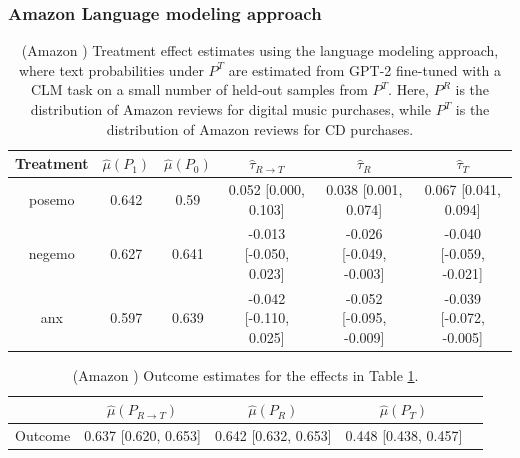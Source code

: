 \documentclass{article}
\begin{document}
\subsubsection{Amazon \cite{przyant2021causal} Language modeling approach}

\begin{table}[!ht]
    \centering
    \begin{tabular}{c|ccccc}
    \toprule
    Treatment   &   $\hat{\mu}(P_1)$ &   $\hat{\mu}(P_0)$ & $\hat{\tau}_{R \rightarrow T}$   & $\hat{\tau}_R$          & $\hat{\tau}_T$          \\
    \midrule
    posemo      &              0.642 &              0.59  & 0.052 [0.000, 0.103]             & 0.038 [0.001, 0.074]    & 0.067 [0.041, 0.094]    \\
    negemo      &              0.627 &              0.641 & -0.013 [-0.050, 0.023]           & -0.026 [-0.049, -0.003] & -0.040 [-0.059, -0.021] \\
    anx         &              0.597 &              0.639 & -0.042 [-0.110, 0.025]           & -0.052 [-0.095, -0.009] & -0.039 [-0.072, -0.005] \\
    \bottomrule
    \end{tabular}
    \caption{(Amazon \cite{przyant2021causal}) Treatment effect estimates using the language modeling approach, where text probabilities under $P^T$ are estimated from GPT-2 fine-tuned with a CLM task on a small number of held-out samples from $P^T$. Here, $P^R$ is the distribution of Amazon reviews for digital music purchases, while $P^T$ is the distribution of Amazon reviews for CD purchases.}
    \label{tab:results_clm_gpt2_finetuned_amazon_pryzant}
\end{table}

\begin{table}[!ht]
    \centering
    \begin{tabular}{c|cccc}
    \toprule
    & $\hat{\mu}(P_{R \rightarrow T})$   & $\hat{\mu}(P_R)$     & $\hat{\mu}(P_T)$     \\
    \midrule
    Outcome & 0.637 [0.620, 0.653]               & 0.642 [0.632, 0.653] & 0.448 [0.438, 0.457] \\  
    \bottomrule
    \end{tabular}
    \caption{(Amazon \cite{przyant2021causal}) Outcome estimates for the effects in Table \ref{tab:results_clm_gpt2_finetuned_amazon_pryzant}.}
    \label{tab:results_clm_gpt2_finetuned_amazon_pryzant_outcome}
\end{table}
\end{document}
